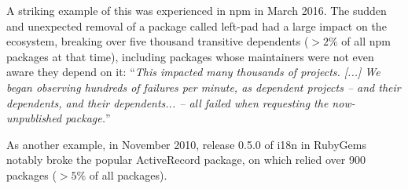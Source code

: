 \documentclass[smallextended]{svjour3}       %
\newcommand{\rubygems}{\textsf{RubyGems}\xspace}
\newcommand{\npm}{\textsf{npm}\xspace}
\begin{document}
A striking example of this was experienced in \npm in March 2016. The sudden and unexpected removal of a package called \textsf{left-pad} had a large impact on the ecosystem, breaking over five thousand transitive dependents ($> 2\%$ of all \npm packages at that time), including packages whose maintainers were not even aware they depend on it:
``\textit{This impacted many thousands of projects. [...] We began observing hundreds of failures per minute, as dependent projects -- and their dependents, and their dependents... -- all failed when requesting the now-unpublished package.}''~\cite{NPM2016}

As another example, in November 2010, release 0.5.0 of \textsf{i18n} in \rubygems notably broke the popular \textsf{ActiveRecord} package, on which relied over 900 packages ($> 5\%$ of all packages).
\end{document}
